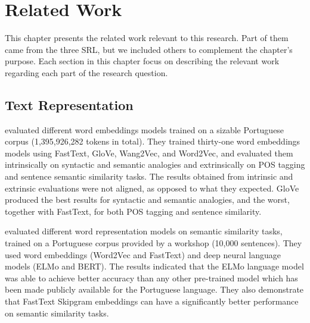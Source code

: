 \chapter{Related Work}\label{cap:related_works}

This chapter presents the related work relevant to this research. Part of them came from the three SRL, but we included others to complement the chapter's purpose. Each section in this chapter focus on describing the relevant work regarding each part of the research question.

\section{Text Representation} \label{sec:related_representation}


\textcite{Hartmann2017} evaluated different word embeddings models trained on a sizable Portuguese corpus (1,395,926,282 tokens in total). They trained thirty-one word embeddings models using FastText, GloVe, Wang2Vec, and Word2Vec, and evaluated them intrinsically on syntactic and semantic analogies and extrinsically on \gls{POS} tagging and sentence semantic similarity tasks. The results obtained from intrinsic and extrinsic evaluations were not aligned, as opposed to what they expected. GloVe produced the best results for syntactic and semantic analogies, and the worst, together with FastText, for both \gls{POS} tagging and sentence similarity. 

\textcite{Rodrigues2020} evaluated different word representation models on semantic similarity tasks, trained on a Portuguese corpus provided by a workshop (10,000 sentences). They used word embeddings (Word2Vec and FastText) and deep neural language models (\gls{ELMo} and \gls{BERT}). The results indicated that the \gls{ELMo} language model was able to achieve better accuracy than any other pre-trained model which has been made publicly available for the Portuguese language. They also demonstrate that FastText Skipgram embeddings can have a significantly better performance on semantic similarity tasks.

